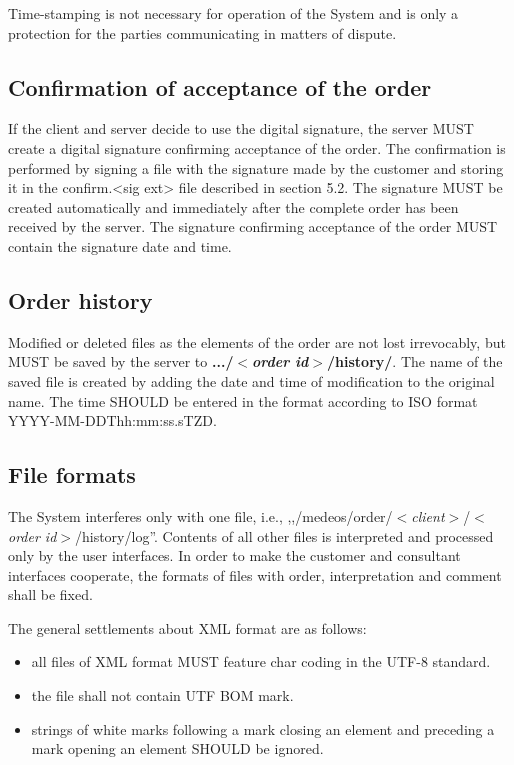\documentclass[a4paper]{article}
\begin{document}
Time-stamping is not necessary for operation of the System and is only a protection for 
the parties communicating in matters of dispute.

\subsection{Confirmation of acceptance of the order}

If the client and server decide to use the digital signature, the server MUST create a 
digital signature confirming acceptance of the order. The confirmation is performed by 
signing a file with the signature made by the customer and storing it in the 
confirm.<sig ext> file described in section 5.2. The signature MUST be created automatically 
and immediately after the complete order has been received by the server. The signature 
confirming acceptance of the order MUST contain the signature date and time.

\subsection{Order history}

Modified or deleted files as the elements of the order are not lost irrevocably, but MUST 
be saved by the server to 
\textbf{.../$<$\textit{order id}$>$/history/}. The name of 
the saved file is created 
by adding the date and time of modification to the original name. The time SHOULD be 
entered in the format according to ISO format YYYY-MM-DDThh:mm:ss.sTZD.

\subsection{File formats}
\label{sec:formaty}

The System interferes only with one file, i.e., \newline
,,/medeos/order/$<$\textit{client}$>$/$<$\textit{order id}$>$/history/log''. \newline
Contents of all other files
is interpreted and processed only by the user interfaces. In order to make the customer and 
consultant interfaces cooperate, the formats of files with order, interpretation and comment 
shall be fixed.

The general settlements about XML format are as follows:
\begin{itemize}
	\item all files of XML format MUST feature char coding in the UTF-8 standard.
	\item the file shall not contain UTF BOM mark.
	\item strings of white marks following a mark closing an element and preceding a 
		mark opening an element SHOULD be ignored.
\end{itemize}
\end{document}
